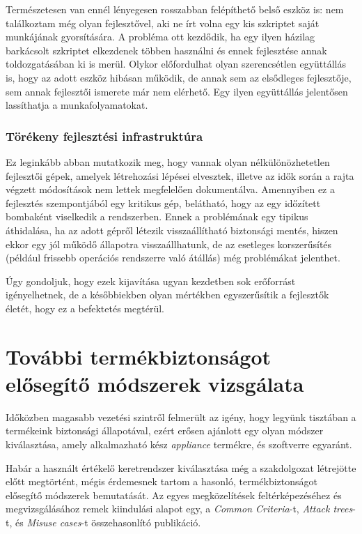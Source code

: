 Természetesen van ennél lényegesen rosszabban felépíthető belső eszköz is: nem találkoztam még olyan
fejlesztővel, aki ne írt volna egy kis szkriptet saját munkájának gyorsítására. A probléma ott
kezdődik, ha egy ilyen házilag barkácsolt szkriptet elkezdenek többen használni és ennek fejlesztése
annak toldozgatásában ki is merül. Olykor előfordulhat olyan szerencsétlen együttállás is, hogy az
adott eszköz hibásan működik, de annak sem az elsődleges fejlesztője, sem annak fejlesztői ismerete
már nem elérhető. Egy ilyen együttállás jelentősen lassíthatja a munkafolyamatokat.

\subsubsection{Törékeny fejlesztési infrastruktúra}
Ez leginkább abban mutatkozik meg, hogy vannak olyan nélkülönözhetetlen fejlesztői gépek, amelyek
létrehozási lépései elvesztek, illetve az idők során a rajta végzett módosítások nem lettek
megfelelően dokumentálva. Amennyiben ez a fejlesztés szempontjából egy kritikus gép, belátható, hogy
az egy időzített bombaként viselkedik a rendszerben. Ennek a problémának egy tipikus áthidalása, ha
az adott gépről létezik visszaállítható biztonsági mentés, hiszen ekkor egy jól működő állapotra
visszaállhatunk, de az esetleges korszerűsítés (például frissebb operációs rendszerre való átállás)
még problémákat jelenthet.

Úgy gondoljuk, hogy ezek kijavítása ugyan kezdetben sok erőforrást igényelhetnek, de a későbbiekben
olyan mértékben egyszerűsítik a fejlesztők életét, hogy ez a befektetés megtérül.

\section{További termékbiztonságot elősegítő módszerek vizsgálata}

Időközben magasabb vezetési szintről felmerült az igény, hogy legyünk tisztában a termékeink
biztonsági állapotával, ezért erősen ajánlott egy olyan módszer kiválasztása, amely alkalmazható
kész \emph{appliance} termékre, és szoftverre egyaránt.

Habár a használt értékelő keretrendszer kiválasztása még a szakdolgozat létrejötte előtt megtörtént,
mégis érdemesnek tartom a hasonló, termékbiztonságot elősegítő módszerek bemutatását. Az egyes
megközelítések feltérképezéséhez és megvizsgálásához remek kiindulási alapot egy, a \emph{Common
Criteria}-t, \emph{Attack trees}-t, és \emph{Misuse cases}-t összehasonlító publikáció.
\cite{ThreeApproaches}

